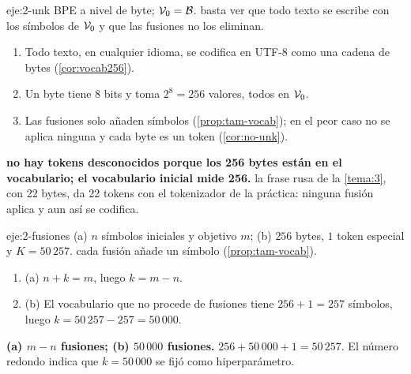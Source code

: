 \begin{solucion}{eje:2-unk}
\datos BPE a nivel de byte; $\mathcal{V}_0=\mathcal{B}$.
\planteamiento basta ver que todo texto se escribe con los símbolos de $\mathcal{V}_0$ y que las fusiones no los eliminan.
\pasos
\begin{enumerate}[label=\arabic*.]
  \item Todo texto, en cualquier idioma, se codifica en UTF-8 como una cadena de bytes (\cref{cor:vocab256}).
  \item Un byte tiene 8 bits y toma $2^{8}=256$ valores, todos en $\mathcal{V}_0$.
  \item Las fusiones solo añaden símbolos (\cref{prop:tam-vocab}); en el peor caso no se aplica ninguna y cada byte es un token (\cref{cor:no-unk}).
\end{enumerate}
\resultado \textbf{no hay tokens desconocidos porque los 256 bytes están en el vocabulario; el vocabulario inicial mide 256.}
\comprobacion la frase rusa de la \cref{tema:3}, con 22 bytes, da 22 tokens con el tokenizador de la práctica: ninguna fusión aplica y aun así se codifica.
\end{solucion}

\begin{solucion}{eje:2-fusiones}
\datos (a) $n$ símbolos iniciales y objetivo $m$; (b) $256$ bytes, $1$ token especial y $K=50\,257$.
\planteamiento cada fusión añade un símbolo (\cref{prop:tam-vocab}).
\pasos
\begin{enumerate}[label=\arabic*.]
  \item (a) $n+k=m$, luego $k=m-n$.
  \item (b) El vocabulario que no procede de fusiones tiene $256+1=257$ símbolos, luego $k=50\,257-257=50\,000$.
\end{enumerate}
\resultado \textbf{(a) $m-n$ fusiones; (b) $50\,000$ fusiones.}
\comprobacion $256+50\,000+1=50\,257$. El número redondo indica que $k=50\,000$ se fijó como hiperparámetro.
\end{solucion}

